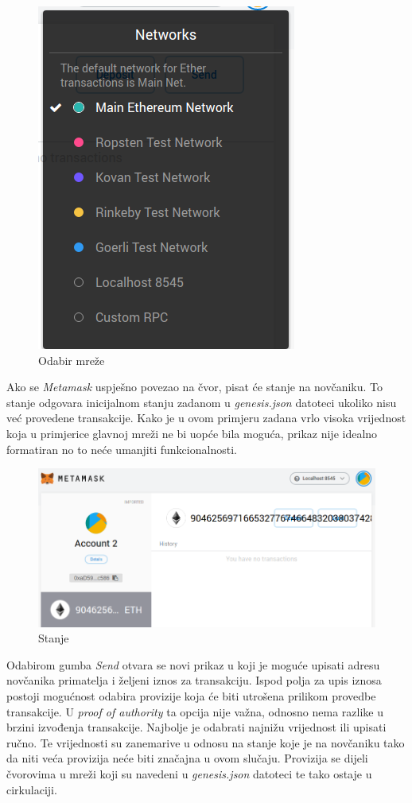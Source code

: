 \documentclass[times, utf8, zavrsni]{fer}
\begin{document}
\begin{figure}[ht]
  \includegraphics[scale=0.5]{mmnetworkdd.png}
  \caption{Odabir mreže}
  \centering
\end{figure}

Ako se \emph{Metamask} uspješno povezao na čvor, pisat će stanje na novčaniku. To stanje odgovara inicijalnom stanju zadanom u \emph{genesis.json} datoteci ukoliko
nisu već provedene transakcije. Kako je u ovom primjeru zadana vrlo visoka vrijednost koja u primjerice glavnoj mreži ne bi uopće bila moguća, prikaz nije idealno
formatiran no to neće umanjiti funkcionalnosti.

\begin{figure}[ht]
  \includegraphics[width=\textwidth]{mmimported.png}
  \caption{Stanje}
  \centering
\end{figure}

Odabirom gumba \emph{Send} otvara se novi prikaz u koji je moguće upisati adresu novčanika primatelja i željeni iznos za transakciju. Ispod polja za upis iznosa
postoji mogućnost odabira provizije koja će biti utrošena prilikom provedbe transakcije. U \emph{proof of authority} ta opcija nije važna, odnosno nema razlike u brzini
izvođenja transakcije. Najbolje je odabrati najnižu vrijednost ili upisati ručno. Te vrijednosti su zanemarive u odnosu na stanje koje je na novčaniku tako da niti veća
provizija neće biti značajna u ovom slučaju. Provizija se dijeli čvorovima u mreži koji su navedeni u \emph{genesis.json} datoteci te tako ostaje u cirkulaciji.
\end{document}
